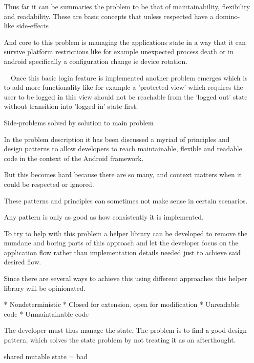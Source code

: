 Thus far it can be summaries the problem to be that of maintainability, flexibility and readability.
These are basic concepts that unless respected have a domino-like side-effects 

And core to this problem is managing the applications state in a way that it can survive platform
restrictions like for example unexpected process death or in android specifically a configuration change
ie device rotation.

~~Once this basic login feature is implemented another problem emerges which is to add more functionality
like for example a 'protected view' which requires the user to be logged in 
this view should not be reachable from the 'logged out' state without
transition into 'logged in' state first.~~

Side-problems solved by solution to main problem

In the problem description it has been discussed a myriad of principles and design patterns
to allow developers to reach maintainable, flexible and readable code in the context of the Android framework.

But this becomes hard because there are so many, and context matters when it could be respected or ignored.

These patterns and principles can sometimes not make sense in certain scenarios.

Any pattern is only as good as how consistently it is implemented. 

To try to help with this problem a helper library can be developed to remove the mundane
and boring parts of this approach and let the developer focus on the application flow rather
than implementation details needed just to achieve said desired flow.

Since there are several ways to achieve this using different approaches this helper
library will be opinionated.






* Nondeterministic
* Closed for extension, open for modification
* Unreadable code
* Unmaintainable code


The developer must thus manage the state. The problem is to find a good design pattern, which solves the state problem by not treating it as an afterthought. 



shared mutable state = bad
